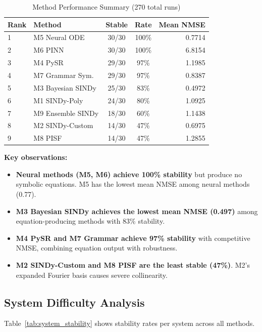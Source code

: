\documentclass[conference]{IEEEtran}
\begin{document}
\begin{table}[!ht]
\centering
\caption{Method Performance Summary (270 total runs)}
\label{tab:leaderboard}
\begin{tabular}{@{}llccr@{}}
\toprule
\textbf{Rank} & \textbf{Method} & \textbf{Stable} & \textbf{Rate} & \textbf{Mean NMSE} \\
\midrule
1 & M5 Neural ODE & 30/30 & 100\% & 0.7714 \\
2 & M6 PINN & 30/30 & 100\% & 6.8154 \\
3 & M4 PySR & 29/30 & 97\% & 1.1985 \\
4 & M7 Grammar Sym. & 29/30 & 97\% & 0.8387 \\
5 & M3 Bayesian SINDy & 25/30 & 83\% & 0.4972 \\
6 & M1 SINDy-Poly & 24/30 & 80\% & 1.0925 \\
7 & M9 Ensemble SINDy & 18/30 & 60\% & 1.1438 \\
8 & M2 SINDy-Custom & 14/30 & 47\% & 0.6975 \\
9 & M8 PISF & 14/30 & 47\% & 1.2855 \\
\bottomrule
\end{tabular}
\end{table}

\textbf{Key observations:}
\begin{itemize}
    \item \textbf{Neural methods (M5, M6) achieve 100\% stability} but produce no symbolic equations. M5 has the lowest mean NMSE among neural methods (0.77).
    \item \textbf{M3 Bayesian SINDy achieves the lowest mean NMSE (0.497)} among equation-producing methods with 83\% stability.
    \item \textbf{M4 PySR and M7 Grammar achieve 97\% stability} with competitive NMSE, combining equation output with robustness.
    \item \textbf{M2 SINDy-Custom and M8 PISF are the least stable (47\%)}. M2's expanded Fourier basis causes severe collinearity.
\end{itemize}

\subsection{System Difficulty Analysis}

Table~\ref{tab:system_stability} shows stability rates per system across all methods.
\end{document}
